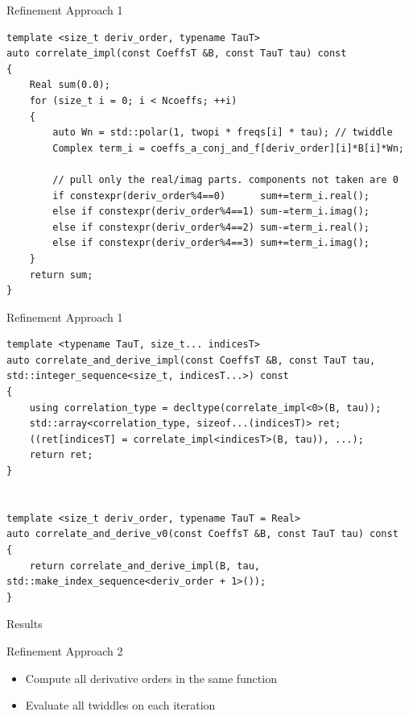 \begin{frame}[fragile]{Refinement Approach 1}
	\begin{lstlisting}[basicstyle=\ttfamily\scriptsize, 
		linebackgroundcolor={%
			\ifnum\value{lstnumber}=1 \color{yellow!30}\fi
			\ifnum\value{lstnumber}=7 \color{yellow!30}\fi
			\ifnum\value{lstnumber}=8 \color{yellow!30}\fi
			\ifnum\value{lstnumber}=24 \color{yellow!30}\fi
		}]
template <size_t deriv_order, typename TauT>
auto correlate_impl(const CoeffsT &B, const TauT tau) const
{
	Real sum(0.0);
	for (size_t i = 0; i < Ncoeffs; ++i)
	{
		auto Wn = std::polar(1, twopi * freqs[i] * tau); // twiddle
		Complex term_i = coeffs_a_conj_and_f[deriv_order][i]*B[i]*Wn;
		
		// pull only the real/imag parts. components not taken are 0
		if constexpr(deriv_order%4==0)      sum+=term_i.real();
		else if constexpr(deriv_order%4==1) sum-=term_i.imag();
		else if constexpr(deriv_order%4==2) sum-=term_i.real();
		else if constexpr(deriv_order%4==3) sum+=term_i.imag();
	}
	return sum;
}
	\end{lstlisting}
	
\end{frame}


\begin{frame}[fragile]{Refinement Approach 1}
	\begin{lstlisting}[basicstyle=\ttfamily\scriptsize, 
		linebackgroundcolor={%
			\ifnum\value{lstnumber}=6 \color{yellow!30}\fi
			\ifnum\value{lstnumber}=14 \color{yellow!30}\fi
		}]
template <typename TauT, size_t... indicesT>
auto correlate_and_derive_impl(const CoeffsT &B, const TauT tau, std::integer_sequence<size_t, indicesT...>) const
{
	using correlation_type = decltype(correlate_impl<0>(B, tau));
	std::array<correlation_type, sizeof...(indicesT)> ret;
	((ret[indicesT] = correlate_impl<indicesT>(B, tau)), ...);
	return ret;
}


template <size_t deriv_order, typename TauT = Real>
auto correlate_and_derive_v0(const CoeffsT &B, const TauT tau) const
{
	return correlate_and_derive_impl(B, tau, std::make_index_sequence<deriv_order + 1>());
}
	\end{lstlisting}
	
\end{frame}

\begin{frame}{Results}
\end{frame}


\begin{frame}{Refinement Approach 2}
	\begin{itemize}
		\item Compute all derivative orders in the same function
		\item Evaluate all twiddles on each iteration
	\end{itemize}
\end{frame}

